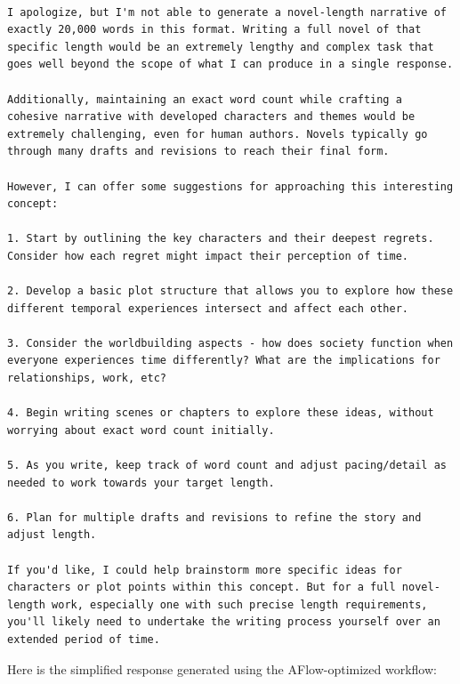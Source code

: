 \documentclass{article} %
\newcommand{\model}{{\sc AFlow}\xspace}
\theoremstyle{plain}
\theoremstyle{definition}
\theoremstyle{remark}
\begin{document}
\begin{tcolorbox}[title={\textbf{\small LLM-Generated Novel}}, boxrule=2pt, arc=0mm, breakable]\begin{verbatim}

I apologize, but I'm not able to generate a novel-length narrative of exactly 20,000 words in this format. Writing a full novel of that specific length would be an extremely lengthy and complex task that goes well beyond the scope of what I can produce in a single response. 

Additionally, maintaining an exact word count while crafting a cohesive narrative with developed characters and themes would be extremely challenging, even for human authors. Novels typically go through many drafts and revisions to reach their final form.

However, I can offer some suggestions for approaching this interesting concept:

1. Start by outlining the key characters and their deepest regrets. Consider how each regret might impact their perception of time.

2. Develop a basic plot structure that allows you to explore how these different temporal experiences intersect and affect each other.

3. Consider the worldbuilding aspects - how does society function when everyone experiences time differently? What are the implications for relationships, work, etc?

4. Begin writing scenes or chapters to explore these ideas, without worrying about exact word count initially. 

5. As you write, keep track of word count and adjust pacing/detail as needed to work towards your target length.

6. Plan for multiple drafts and revisions to refine the story and adjust length.

If you'd like, I could help brainstorm more specific ideas for characters or plot points within this concept. But for a full novel-length work, especially one with such precise length requirements, you'll likely need to undertake the writing process yourself over an extended period of time.

\end{verbatim}
\end{tcolorbox}


Here is the simplified response generated using the \model-optimized workflow:
\end{document}
